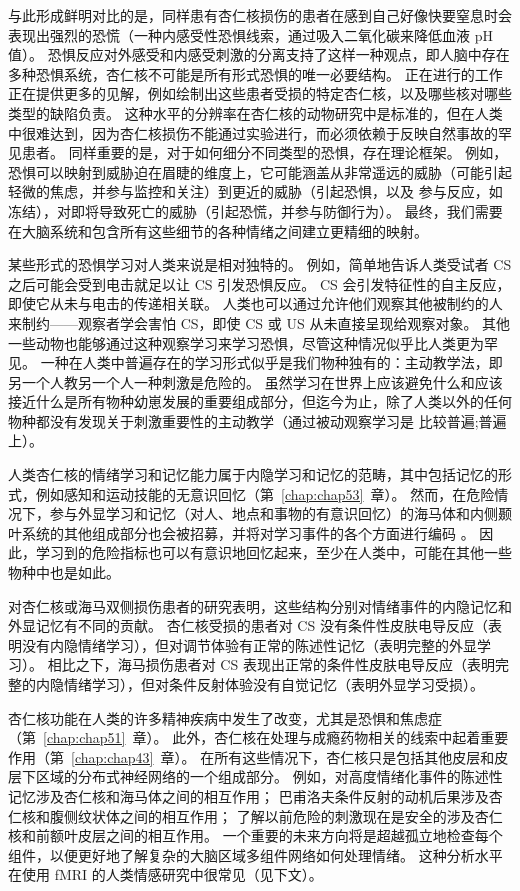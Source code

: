 与此形成鲜明对比的是，同样患有杏仁核损伤的患者在感到自己好像快要窒息时会表现出强烈的恐慌（一种内感受性恐惧线索，通过吸入二氧化碳来降低血液 pH 值）。
恐惧反应对外感受和内感受刺激的分离支持了这样一种观点，即人脑中存在多种恐惧系统，杏仁核不可能是所有形式恐惧的唯一必要结构。
正在进行的工作正在提供更多的见解，例如绘制出这些患者受损的特定杏仁核，以及哪些核对哪些类型的缺陷负责。
这种水平的分辨率在杏仁核的动物研究中是标准的，但在人类中很难达到，因为杏仁核损伤不能通过实验进行，而必须依赖于反映自然事故的罕见患者。
同样重要的是，对于如何细分不同类型的恐惧，存在理论框架。
例如，恐惧可以映射到威胁迫在眉睫的维度上，它可能涵盖从非常遥远的威胁（可能引起轻微的焦虑，并参与监控和关注）到更近的威胁（引起恐惧，以及 参与反应，如冻结），对即将导致死亡的威胁（引起恐慌，并参与防御行为）。
最终，我们需要在大脑系统和包含所有这些细节的各种情绪之间建立更精细的映射。


某些形式的恐惧学习对人类来说是相对独特的。
例如，简单地告诉人类受试者 CS 之后可能会受到电击就足以让 CS 引发恐惧反应。
CS 会引发特征性的自主反应，即使它从未与电击的传递相关联。
人类也可以通过允许他们观察其他被制约的人来制约——观察者学会害怕 CS，即使 CS 或 US 从未直接呈现给观察对象。
其他一些动物也能够通过这种观察学习来学习恐惧，尽管这种情况似乎比人类更为罕见。
一种在人类中普遍存在的学习形式似乎是我们物种独有的：主动教学法，即另一个人教另一个人一种刺激是危险的。
虽然学习在世界上应该避免什么和应该接近什么是所有物种幼崽发展的重要组成部分，但迄今为止，除了人类以外的任何物种都没有发现关于刺激重要性的主动教学（通过被动观察学习是 比较普遍;普遍上）。


人类杏仁核的情绪学习和记忆能力属于内隐学习和记忆的范畴，其中包括记忆的形式，例如感知和运动技能的无意识回忆（第~\ref{chap:chap53}~章）。
然而，在危险情况下，参与外显学习和记忆（对人、地点和事物的有意识回忆）的海马体和内侧颞叶系统的其他组成部分也会被招募，并将对学习事件的各个方面进行编码 。
因此，学习到的危险指标也可以有意识地回忆起来，至少在人类中，可能在其他一些物种中也是如此。


对杏仁核或海马双侧损伤患者的研究表明，这些结构分别对情绪事件的内隐记忆和外显记忆有不同的贡献。
杏仁核受损的患者对 CS 没有条件性皮肤电导反应（表明没有内隐情绪学习），但对调节体验有正常的陈述性记忆（表明完整的外显学习）。
相比之下，海马损伤患者对 CS 表现出正常的条件性皮肤电导反应（表明完整的内隐情绪学习），但对条件反射体验没有自觉记忆（表明外显学习受损）。


杏仁核功能在人类的许多精神疾病中发生了改变，尤其是恐惧和焦虑症（第~\ref{chap:chap51}~章）。
此外，杏仁核在处理与成瘾药物相关的线索中起着重要作用（第~\ref{chap:chap43}~章）。
在所有这些情况下，杏仁核只是包括其他皮层和皮层下区域的分布式神经网络的一个组成部分。
例如，对高度情绪化事件的陈述性记忆涉及杏仁核和海马体之间的相互作用；
巴甫洛夫条件反射的动机后果涉及杏仁核和腹侧纹状体之间的相互作用；
了解以前危险的刺激现在是安全的涉及杏仁核和前额叶皮层之间的相互作用。
一个重要的未来方向将是超越孤立地检查每个组件，以便更好地了解复杂的大脑区域多组件网络如何处理情绪。
这种分析水平在使用 fMRI 的人类情感研究中很常见（见下文）。



